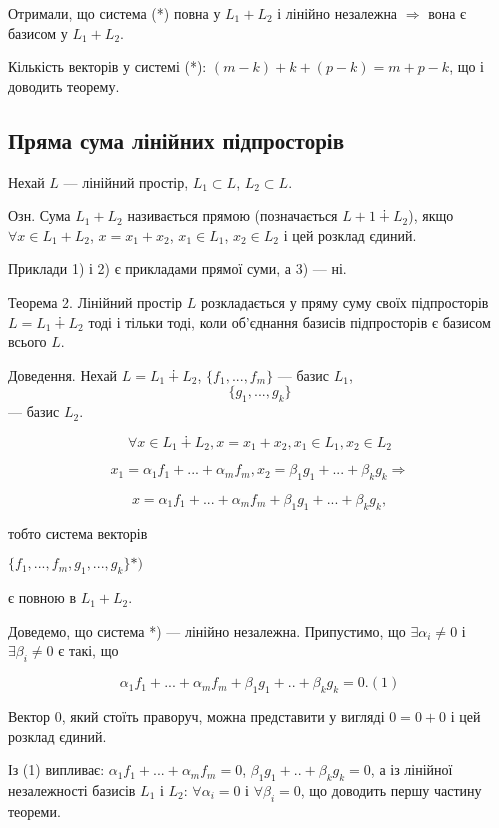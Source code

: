 Отримали, що система (*) повна у $L_1 + L_2$ і лінійно незалежна $\Rightarrow$ вона є
базисом у $L_1 + L_2$.


Кількість векторів у системі (*): $(m - k) + k + (p - k) = m + p - k$,
що і доводить теорему. 

\subsection*{Пряма сума лінійних підпросторів}

Нехай $L$ --- лінійний простір, $L_1 \subset L$, $L_2 \subset L$.

Озн. Сума $L_1 + L_2$ називається прямою (позначається $L+1 \dotplus L_2$), якщо
$\forall x \in L_1 + L_2$, $x = x_1 + x_2$, $x_1 \in L_1$, $x_2 \in L_2$ і цей розклад єдиний.

Приклади 1) і 2) є прикладами прямої суми, а 3) --- ні.

Теорема 2. Лінійний простір $L$ розкладається у пряму суму своїх
підпросторів $L = L_1 \dotplus L_2$ тоді і тільки тоді, коли об’єднання базисів
підпросторів є базисом всього $L$.

Доведення. Нехай $L = L_1 \dotplus L_2$, $\{f_1, ..., f_m\}$ --- базис $L_1$, $$\{g_1, ..., g_k\}$$ --- базис
$L_2$.


$$\forall x \in L_1 \dotplus L_2, x = x_1 + x_2, x_1 \in L_1, x_2 \in L_2$$

$$x_1 = \alpha_1 f_1 + ... + \alpha_m f_m, x_2 = \beta_1 g_1 + ... + \beta_k g_k \Rightarrow$$

$$x = \alpha_1 f_1 + ... + \alpha_m f_m + \beta_1 g_1 + ... + \beta_k g_k,$$

тобто система векторів

$\{f_1, ..., f_m, g_1, ..., g_k\} *)$

є повною в $L_1 + L_2$.

Доведемо, що система *) --- лінійно незалежна. Припустимо, що
$\exists \alpha_i \neq 0$ і $\exists \beta_i \neq 0$ є такі, що

$$\alpha_1 f_1 + ... + \alpha_m f_m + \beta_1 g_1 + .. + \beta_k g_k = 0. (1)$$

Вектор 0, який стоїть праворуч, можна представити у вигляді $0 = 0 + 0$ і цей
розклад єдиний.

Із (1) випливає: $\alpha_1 f_1 + ... + \alpha_m f_m = 0$, $\beta_1 g_1 + .. + \beta_k g_k = 0$,
а із лінійної незалежності базисів $L_1$ і $L_2$: $\forall \alpha_i = 0$ і $\forall \beta_i = 0$,
що доводить першу частину теореми.


